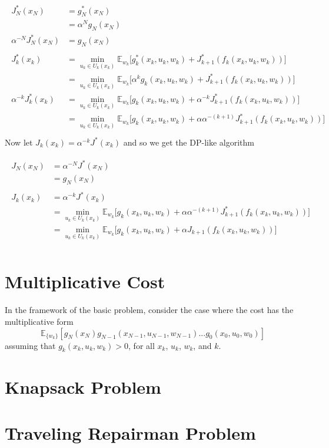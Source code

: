 \documentclass[11pt, oneside]{article}   	%
\begin{document}
\begin{align} 
\begin{split}
J^{*}_N(x_N) &= g^{*}_N (x_N)\\ 
&= \alpha^N g_N(x_N)\\
\alpha^{-N} J^{*}_N(x_N) &= g_N(x_N)\\
\\
J^{*}_k(x_k) &= \min_{u_k \in U_k(x_k)} \mathbb{E}_{w_k} \big[g^{*}_k(x_k, u_k, w_k) + J^{*}_{k+1}(f_k(x_k, u_k, w_k))\big]\\
&= \min_{u_k \in U_k(x_k)} \mathbb{E}_{w_k} \big[\alpha^k g_k(x_k, u_k, w_k) + J^{*}_{k+1}(f_k(x_k, u_k, w_k))\big]\\
\alpha^{-k} J^{*}_k(x_k) &= \min_{u_k \in U_k(x_k)} \mathbb{E}_{w_k} \big[g_k(x_k, u_k, w_k) + \alpha^{-k} J^{*}_{k+1}(f_k(x_k, u_k, w_k))\big]\\
&= \min_{u_k \in U_k(x_k)} \mathbb{E}_{w_k} \big[g_k(x_k, u_k, w_k) + \alpha \alpha^{-(k+1)} J^{*}_{k+1}(f_k(x_k, u_k, w_k))\big]\\
\end{split}					
\end{align} 
Now let $J_k(x_k) = \alpha^{-k} J^{*} (x_k)$ and so we get the DP-like algorithm

\begin{align} 
\begin{split}
J_N(x_N) &= \alpha^{-N} J^{*}(x_N)\\
&= g_N(x_N)\\
\\
J_k(x_k)&= \alpha^{-k} J^{*}(x_k)\\
&= \min_{u_k \in U_k(x_k)} \mathbb{E}_{w_k} \big[g_k(x_k, u_k, w_k) + \alpha \alpha^{-(k+1)} J^{*}_{k+1}(f_k(x_k, u_k, w_k))\big]\\
&= \min_{u_k \in U_k(x_k)} \mathbb{E}_{w_k} \big[g_k(x_k, u_k, w_k) + \alpha J_{k+1}(f_k(x_k, u_k, w_k))\big]\\
\end{split}					
\end{align} 

\section{Multiplicative Cost}
In the framework of the basic problem, consider the case where the cost has the multiplicative form $$\mathbb{E}_{\{w_k\}}[g_N(x_N) g_{N-1}(x_{N-1}, u_{N-1}, w_{N-1})... g_{0}(x_{0}, u_{0}, w_{0})]$$ assuming that $g_{k}(x_{k}, u_{k}, w_{k}) > 0
$, for all $x_k$, $u_k$, $w_k$, and $k$. \\

\section{Knapsack Problem}

\section{Traveling Repairman Problem}
\end{document}
